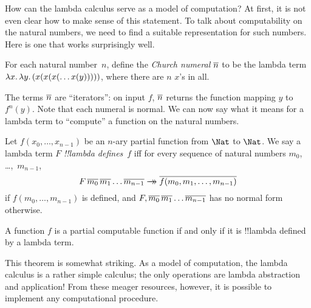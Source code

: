 \documentclass[../../../include/open-logic-section]{subfiles}
\begin{document}

How can the lambda calculus serve as a model of computation? At first,
it is not even clear how to make sense of this statement. To talk
about computability on the natural numbers, we need to find a suitable
representation for such numbers. Here is one that works surprisingly
well.

\begin{defn}
For each natural number~$n$, define the \emph{Church numeral} $\overline{n}$ to be
the lambda term $\lambd[x][\lambd[y][(x(x(x(\dots x(y)))))]]$, where
there are $n$ $x$'s in all.
\end{defn}

The terms $\overline{n}$ are ``iterators'': on input $f$, $\overline{n}$ returns
the function mapping $y$ to $f^n(y)$. Note that each numeral is
normal. We can now say what it means for a lambda term to ``compute''
a function on the natural numbers.

\begin{defn}
Let $f(x_0, \dots, x_{n-1})$ be an $n$-ary partial function from $\Nat$
to $\Nat$. We say a lambda term $F$ \emph{!!{lambda define}s}~$f$ iff for every
sequence of natural numbers $m_0$, \dots,~$m_{n-1}$,
\[
F\, \num{m_0}\, \num{m_1} \dots \num{m_{n-1}} \red \num{f(m_0, m_1, \dots,
  m_{n-1})}
\]
if $f(m_0, \dots, m_{n-1})$ is defined, and $F, \overline{m_0}\, \overline{m_1}
\dots \overline{m_{n-1}}$ has no normal form otherwise.
\end{defn}

\begin{thm}
A function $f$ is a partial computable function if and only if it is
!!{lambda defined} by a lambda term.
\end{thm}

\begin{explain}
This theorem is somewhat striking. As a model of computation, the
lambda calculus is a rather simple calculus; the only operations are
lambda abstraction and application!{} From these meager resources,
however, it is possible to implement any computational procedure.
\end{explain}
\end{document}
